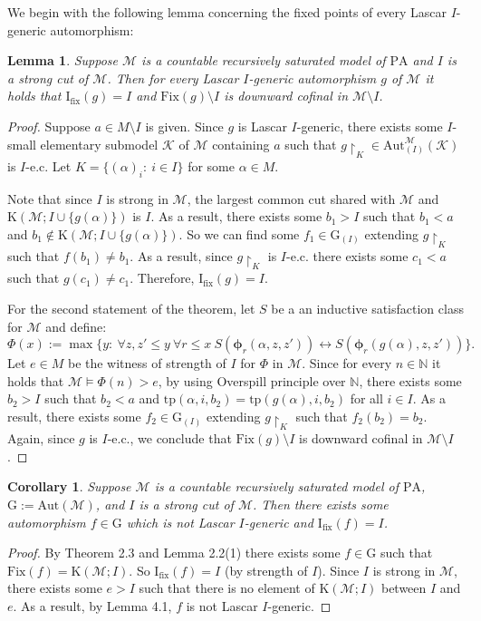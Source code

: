 \documentclass[11pt]{article}
\theoremstyle{plain}
\newtheorem{lem}[theorem]{Lemma}
\newtheorem{cor}[theorem]{Corollary}
\theoremstyle{definition}
\newcommand{\M}{\mathcal{M}}
\newcommand{\K}{\mathcal{K}}
\newcommand{\NN}{\mathbb{N}}
\newcommand{\I}{\mathrm{I_{fix}}}
\newcommand{\G}{\mathrm{G}}
\newcommand{\A}{\mathrm{Aut}}
\newcommand{\Aa}{\A_{(I)}^{\M}(\K)}
\newcommand{\pa}{\mathrm{PA}}
\newcommand{\fix}{\mathrm{Fix}}
\newcommand{\KK}{\mathrm{K}}
\newcommand{\tp}{\mathrm{tp}}
\begin{document}
We begin with the following lemma concerning the fixed points of every Lascar $I$-generic automorphism:

\begin{lem}
	Suppose $\M$ is a countable recursively saturated model of $\pa$ and $I$ is a  strong cut of $\M$. Then for every Lascar $I$-generic automorphism $g$ of $\M$ it holds that $ 	\I(g)=I $ and $ \fix(g)\setminus I$ is downward cofinal in $\M\setminus I $.
\end{lem}
\begin{proof}
	Suppose  $a\in M\setminus I$ is given. Since $ g $ is Lascar $I$-generic, there exists some $I$-small elementary submodel $ \K$ of $\M $ containing $ a $ such that $ g\upharpoonright_{K}\in\Aa $ is $I$-e.c.  Let $K=\{(\alpha)_{i}: \  i\in I\}$ for some $\alpha\in M$.
	
Note that	since $I$ is strong in $\M$,  the largest  common cut shared with $\M$ and ${\KK(\M;I\cup\{g(\alpha)\})}$ is $I$. As a result, there exists some $b_{1}>I$  such that $b_{1}<a$ and ${b_{1}\notin\KK(\M;I\cup\{g(\alpha)\})}$. So we can find some  $ f_{1}\in \G_{(I)} $ extending $ g\upharpoonright_{K} $ such that $ f(b_{1})\neq b_{1} $. As  a result,  since $g\upharpoonright_{K}$ is $I$-e.c. there exists some $c_{1}<a$ such that $g(c_{1})\neq c_{1}$. Therefore, $ 	\I(g)=I $.
	
	For the second statement of the theorem, let $S$ be a an inductive satisfaction class for $\M$ and define:
	$$\Phi(x):=\max\{y: \ \forall z,z'\leq y  \ \forall r\leq x \ S(\bm{\phi}_{r}(\alpha,z,z'))\leftrightarrow S(\bm{\phi}_{r}(g(\alpha),z,z'))\}. $$
	Let $e\in M$ be the witness of strength of $I$ for $\Phi$ in $\M$. Since for every $n\in\NN$ it holds that $\M\models \Phi(n)>e$, by using Overspill principle over $\NN$, there exists some $b_{2}>I$ such that $b_{2}<a$ and $\tp(\alpha,i,b_{2})=\tp(g(\alpha),i,b_{2})$ for all $i\in I$. As a result, there exists some $ f_{2}\in\G_{(I)} $ extending $g\upharpoonright_{K}  $ such that $ f_{2}(b_{2})=b_{2} $. Again, since $g$ is  $I$-e.c., we conclude that  $ \fix(g)\setminus I$ is downward cofinal in $\M\setminus I $.
\end{proof}
\begin{cor}
	
	Suppose $\M$ is a countable recursively saturated model of $\pa$, $\G:=\A(\M)$, and $I$ is a  strong cut of $\M$. Then there exists some automorphism $ f\in\G $ which is not  Lascar $I$-generic and $\I(f)=I$.
\end{cor}
\begin{proof}
	By Theorem 2.3 and Lemma 2.2(1)  there exists some $ f\in \G $ such that $ \fix(f)=\KK(\M;I) $. So $\I(f)=I$ (by strength of $I$). Since $I$ is strong in $\M$, there exists some $e>I$ such that there is no element of $\KK(\M;I) $ between $I$ and $e$. As a result, by Lemma 4.1,   $f$ is not Lascar $I$-generic.
\end{proof}
\end{document}
